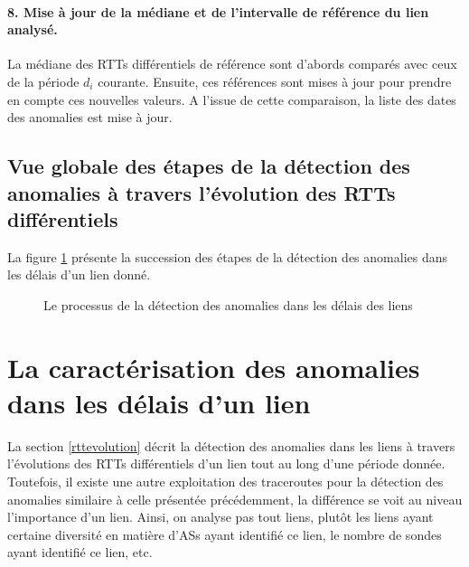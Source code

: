  \paragraph{8. Mise à jour de la médiane et de l'intervalle de  référence du lien analysé.} La médiane des RTTs différentiels de référence sont d'abords comparés avec ceux de la période $d_i$ courante. Ensuite, ces références sont mises à jour pour prendre en compte ces nouvelles valeurs. A l'issue de cette comparaison, la liste des dates des anomalies est mise à jour.
  


\subsection{Vue globale des étapes de la détection des anomalies à travers l'évolution des RTTs différentiels}
La figure 	\ref{fig:process-rttanalysis_tex} présente la succession des étapes de la détection des anomalies dans les délais d'un lien donné. 

\begin{figure}[h]
	\centering
	\resizebox{\textwidth}{\textheight}{
		
	}
	\caption{Le processus de la détection des anomalies dans les délais des liens}
	\label{fig:process-rttanalysis_tex}
\end{figure}



\section{La caractérisation des anomalies dans les délais d'un lien}
La section \ref{rttevolution} décrit la détection des anomalies dans les liens à travers l'évolutions des RTTs différentiels d'un lien tout au long d'une période donnée. Toutefois, il existe une autre exploitation des traceroutes pour la détection des anomalies similaire à celle présentée précédemment, la différence se voit au niveau l'importance d'un lien. Ainsi, on analyse pas tout liens, plutôt les liens ayant certaine diversité en matière d'ASs ayant identifié ce lien, le nombre de sondes ayant identifié ce lien, etc. 
